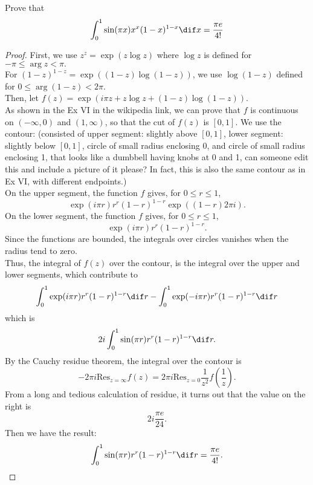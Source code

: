 \documentclass[color=green,titlestyle=hang]{elegantbook}%
\begin{document}
\begin{example}
Prove that\[\int_0^1\sin(\pi x)x^x(1-x)^{1-x}\dif x=\frac{\pi e}{4!}\]
\end{example}\begin{proof}
First, we use $z^z = \exp ( z \log z )$ where $\log z$ is defined for $-\pi\leq \arg z < \pi.$\\
For $(1-z)^{1-z} = \exp ( (1-z)\log (1-z) )$, we use $\log (1-z)$ defined for $0\leq \arg(1-z) <2\pi$.\\
Then, let $f(z)= \exp( i\pi z + z \log z + (1-z) \log (1-z) ).$\\
As shown in the Ex VI in the wikipedia link, we can prove that $f$ is continuous on $(-\infty, 0)$ and $(1,\infty)$, so that the cut of $f(z)$ is $[0,1]$.
We use the contour: (consisted of upper segment: slightly above $[0,1]$, lower segment: slightly below $[0,1]$, circle of small radius enclosing 0, and circle of small radius enclosing 1, that looks like a dumbbell having knobs at 0 and 1, can someone edit this and include a picture of it please? In fact, this is also the same contour as in Ex VI, with different endpoints.)\\
On the upper segment, the function $f$ gives, for $0\leq r \leq 1$,
\[\exp(i\pi r) r^r (1-r)^{1-r} \exp( (1-r) 2\pi i ).\]
On the lower segment, the function $f$ gives, for $0\leq r \leq 1$,
\[\exp(i\pi r) r^r(1-r)^{1-r}.\]
Since the functions are bounded, the integrals over circles vanishes when the radius tend to zero.\\
Thus, the integral of $f(z)$ over the contour, is the integral over the upper and lower segments, which contribute to
\[\int_0^1 \exp(i\pi r) r^r (1-r)^{1-r} \dif r - \int_0^1 \exp(-i\pi r) r^r(1-r)^{1-r} \dif r\]
which is
\[2i \int_0^1 \sin(\pi r) r^r (1-r)^{1-r} \dif r.\]
By the Cauchy residue theorem, the integral over the contour is
\[-2\pi i \textrm{Res}_{z=\infty} f(z) = 2\pi i \textrm{Res}_{z=0} \frac{1}{z^2} f(\frac 1 z).\]
From a long and tedious calculation of residue, it turns out that the value on the right is
\[2i \frac{\pi e}{24}.\]
Then we have the result:
\[\int_0^1 \sin(\pi r) r^r (1-r)^{1-r} \dif r = \frac{\pi e}{4!}.	\]
\end{proof}
\end{document}
